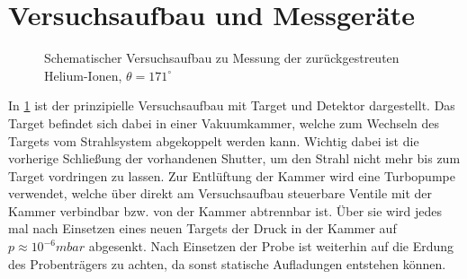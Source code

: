 \section{Versuchsaufbau und Messgeräte}
\begin{figure}[htbp]  
     
  \caption{Schematischer Versuchsaufbau zu Messung der zurückgestreuten Helium-Ionen, $\theta=171^\circ$}
  \label{aufbau}
\end{figure}

In \ref{aufbau} ist der prinzipielle Versuchsaufbau mit Target und Detektor dargestellt. Das Target befindet sich dabei in einer Vakuumkammer, welche zum Wechseln des Targets vom Strahlsystem abgekoppelt werden kann. Wichtig dabei ist die vorherige Schließung der vorhandenen  Shutter, um den Strahl nicht mehr bis zum Target vordringen zu lassen. Zur Entlüftung der Kammer wird eine Turbopumpe verwendet, welche über direkt am Versuchsaufbau steuerbare Ventile mit der Kammer verbindbar bzw. von der Kammer abtrennbar ist. Über sie wird jedes mal nach Einsetzen eines neuen Targets der Druck in der Kammer auf $p \approx 10^{-6} mbar$ abgesenkt. Nach Einsetzen der Probe ist weiterhin auf die Erdung des Probenträgers zu achten, da sonst statische Aufladungen entstehen können. 
